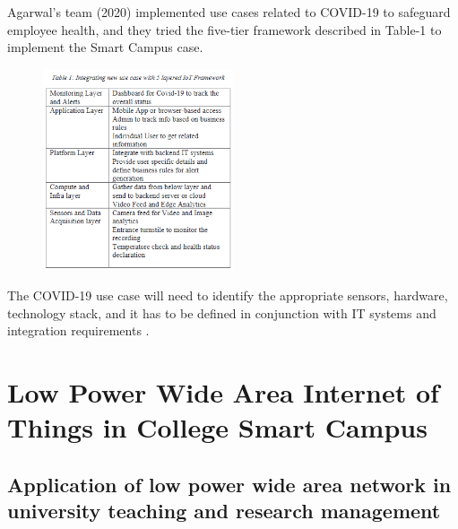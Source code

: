 \documentclass[conference]{IEEEtran}
\begin{document}
Agarwal's team (2020) implemented use cases related to COVID-19 to safeguard employee health, and they tried the five-tier framework described in Table-1 to implement the Smart Campus case.
\begin{figure}
    \centering
    \includegraphics[width=0.5\textwidth]{bibliography/images/Table-1.png}
\end{figure}
The COVID-19 use case will need to identify the appropriate sensors, hardware, technology stack, and it has to be defined in conjunction with IT systems and integration requirements \cite{INTCAMPUS:ApplicationOfSmartCity}.

\section{Low Power Wide Area Internet of Things in College Smart Campus}
\subsection{Application of low power wide area network in university teaching and research management}
 
\end{document}
